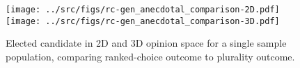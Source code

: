 \begin{figure*}
\texttt{[image: ../src/figs/rc-gen\_anecdotal\_comparison-2D.pdf]}\vspace{-3mm}
\texttt{[image: ../src/figs/rc-gen\_anecdotal\_comparison-3D.pdf]}
\caption{Elected candidate in 2D and 3D opinion space for a single sample population, comparing ranked-choice outcome to plurality outcome.}
\label{fig:plurality_vs_rc_anecdotal}
\end{figure*}
